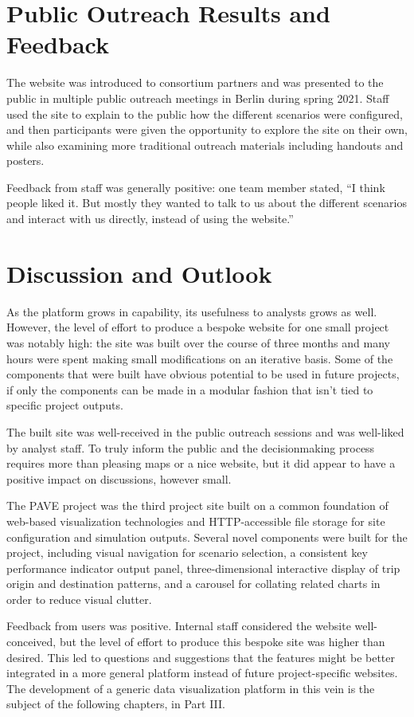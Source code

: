 \section{Public Outreach Results and Feedback}
\label{pave-feedback}

The website was introduced to consortium partners and was presented to the public in multiple public outreach meetings in Berlin during spring 2021. Staff used the site to explain to the public how the different scenarios were configured, and then participants were given the opportunity to explore the site on their own, while also examining more traditional outreach materials including handouts and posters.

Feedback from staff was generally positive: one team member stated, ``I think people liked it. But mostly they wanted to talk to us about the different scenarios and interact with us directly, instead of using the website.''


\section{Discussion and Outlook}
\label{pave-discussion}

As the platform grows in capability, its usefulness to analysts grows as well. However, the level of effort to produce a bespoke website for one small project was notably high: the site was built over the course of three months and many hours were spent making small modifications on an iterative basis. Some of the components that were built have obvious potential to be used in future projects, if only the components can be made in a modular fashion that isn't tied to specific project outputs.

The built site was well-received in the public outreach sessions and was well-liked by analyst staff. To truly inform the public and the decisionmaking process requires more than pleasing maps or a nice website, but it did appear to have a positive impact on discussions, however small.

The PAVE project was the third project site built on a common foundation of web-based visualization technologies and HTTP-accessible file storage for site configuration and simulation outputs. Several novel components were built for the project, including visual navigation for scenario selection, a consistent key performance indicator output panel, three-dimensional interactive display of trip origin and destination patterns, and a carousel for collating related charts in order to reduce visual clutter.

Feedback from users was positive. Internal staff considered the website well-conceived, but the level of effort to produce this bespoke site was higher than desired. This led to questions and suggestions that the features might be better integrated in a more general platform instead of future project-specific websites. The development of a generic data visualization platform in this vein is the subject of the following chapters, in Part III.
